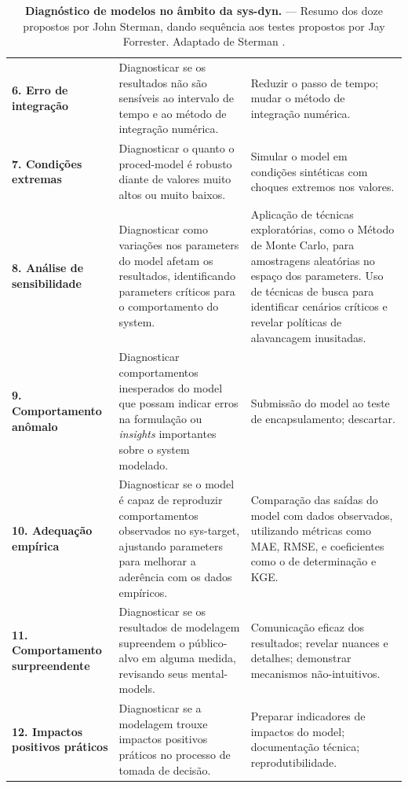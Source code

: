 \documentclass[./main.tex]{subfiles}
\begin{document}
{\begin{table}[t!]
\begin{tabular}{ 
 >{\raggedright\arraybackslash}m{2.75cm}  
 >{\raggedright\arraybackslash}m{5cm}  
 >{\raggedright\arraybackslash}m{5cm}}
        \textbf{6. Erro de integração} & Diagnosticar se os resultados não são sensíveis ao intervalo de tempo e ao método de integração numérica.& Reduzir o passo de tempo; mudar o método de integração numérica.\\        
        
        \textbf{7. Condições extremas} & Diagnosticar o quanto o \gls{proced-model} é robusto diante de valores muito altos ou muito baixos.& Simular o \gls{model} em condições sintéticas com choques extremos nos valores.\\

        \textbf{8. Análise de sensibilidade} & Diagnosticar como variações nos \gls{parameters} do \gls{model} afetam os resultados, identificando \gls{parameters} críticos para o comportamento do \gls{system}. & Aplicação de técnicas exploratórias, como o Método de Monte Carlo, para amostragens aleatórias no espaço dos \gls{parameters}. Uso de técnicas de busca para identificar cenários críticos e revelar políticas de alavancagem inusitadas.\\
        
        \textbf{9. Comportamento anômalo} & Diagnosticar comportamentos inesperados do \gls{model} que possam indicar erros na formulação ou \textit{insights} importantes sobre o \gls{system} modelado. & Submissão do \gls{model} ao teste de encapsulamento; descartar.\\
        
        \textbf{10. Adequação empírica} & Diagnosticar se o \gls{model} é capaz de reproduzir comportamentos observados no \gls{sys-target}, ajustando \gls{parameters} para melhorar a aderência com os dados empíricos. & Comparação das saídas do \gls{model} com dados observados, utilizando métricas como MAE, RMSE, e coeficientes como o de determinação e KGE.\\
        
        \textbf{11. Comportamento surpreendente} & Diagnosticar se os resultados de modelagem supreendem o público-alvo em alguma medida,  revisando seus \gls{mental-models}.& 
        Comunicação eficaz dos resultados; revelar nuances e detalhes; demonstrar mecanismos não-intuitivos.\\  
        
        \textbf{12. Impactos positivos práticos} & Diagnosticar se a modelagem trouxe impactos positivos práticos no processo de tomada de decisão.& Preparar indicadores de impactos do \gls{model}; documentação técnica; reprodutibilidade.\\  
        \bottomrule
    \end{tabular}
    \caption[Diagnóstico de modelos.]{
    \textbf{Diagnóstico de modelos no âmbito da \gls{sys-dyn}.}\; --- \;Resumo dos doze   propostos por John Sterman, dando sequência aos testes propostos por Jay Forrester. Adaptado de Sterman \cite{sterman2000}.
    }
    \label{tbl:tests}
\end{table}
}
\end{document}
